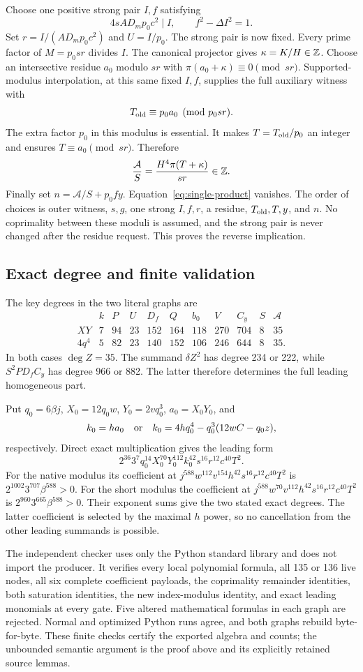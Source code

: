 Choose one positive strong pair $I,f$ satisfying
\[
 4sAD_m p_0c^2\mid I,
 \qquad f^2-\Delta I^2=1.
\]
Set $r=I/(AD_mp_0c^2)$ and $U=I/p_0$. The strong pair is now fixed.
Every prime factor of $M=p_0sr$ divides $I$. The canonical projector
gives $\kappa=K/H\in\mathbb Z$. Choose an intersective residue $a_0$ modulo
$sr$ with $\pi(a_0+\kappa)\equiv0\pmod{sr}$. Supported-modulus
interpolation, at this same fixed $I,f$, supplies the full auxiliary
witness with
\[
 T_{\rm old}\equiv p_0a_0\pmod{p_0sr}.
\]
The extra factor $p_0$ in this modulus is essential. It makes
$T=T_{\rm old}/p_0$ an integer and ensures $T\equiv a_0\pmod{sr}$.
Therefore
\[
 \frac{\mathcal A}{S}
     =\frac{H^4\pi(T+\kappa)}{sr}\in\mathbb Z.
\]
Finally set $n=\mathcal A/S+p_0fy$. Equation~\eqref{eq:single-product}
vanishes. The order of choices is outer witness, $s,g$, one strong
$I,f,r$, a residue, $T_{\rm old},T,y$, and $n$. No coprimality between
these moduli is assumed, and the strong pair is never changed after
the residue request. This proves the reverse implication.

\subsection{Exact degree and finite validation}
The key degrees in the two literal graphs are
\[
\begin{array}{c|rrrrrrrrrr}
 &k&P&U&D_f&Q&b_0&V&C_y&S&\mathcal A\\\hline
XY&7&94&23&152&164&118&270&704&8&35\\
4q^4&5&82&23&140&152&106&246&644&8&35.
\end{array}
\]
In both cases $\deg Z=35$. The summand $\delta Z^2$ has degree 234
or 222, while $S^2PD_fC_y$ has degree 966 or 882. The latter therefore
determines the full leading homogeneous part.

Put $q_0=6\beta j$, $X_0=12q_0w$, $Y_0=2vq_0^3$,
$a_0=X_0Y_0$, and
\[
 k_0=ha_0\quad\hbox{or}\quad
 k_0=4hq_0^4-q_0^3(12wC-q_0z),
\]
respectively. Direct exact multiplication gives the leading form
\[
 2^{36}3^7q_0^{14}X_0^{70}Y_0^{112}k_0^{42}
       s^{16}r^{12}c^{40}T^2.
\]
For the native modulus its coefficient at
$j^{588}w^{112}v^{154}h^{42}s^{16}r^{12}c^{40}T^2$ is
$2^{1002}3^{707}\beta^{588}>0$. For the short modulus the coefficient
at $j^{588}w^{70}v^{112}h^{42}s^{16}r^{12}c^{40}T^2$ is
$2^{960}3^{665}\beta^{588}>0$. Their exponent sums give the two
stated exact degrees. The latter coefficient is selected by the maximal
$h$ power, so no cancellation from the other leading summands is possible.

The independent checker uses only the Python standard library and
does not import the producer. It verifies every local polynomial formula,
all 135 or 136 live nodes, all six complete coefficient payloads,
the coprimality remainder identities, both saturation identities,
the new index-modulus identity, and exact leading monomials at every
gate. Five altered mathematical formulas in each graph are rejected.
Normal and optimized Python runs agree, and both graphs rebuild
byte-for-byte. These finite checks certify the exported algebra and
counts; the unbounded semantic argument is the proof above and its
explicitly retained source lemmas.
